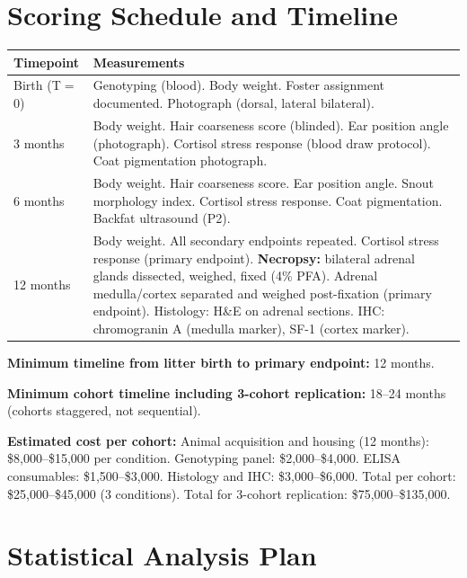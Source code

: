 \documentclass[10pt, a4paper]{article}
\begin{document}
\section{Scoring Schedule and Timeline}
\label{sec:timeline}

\begin{center}
\small
\begin{tabular}{p{2.2cm}p{9.5cm}}
\toprule
\textbf{Timepoint} & \textbf{Measurements} \\
\midrule
Birth (T$=$0) &
Genotyping (blood). Body weight.
Foster assignment documented.
Photograph (dorsal, lateral bilateral). \\[0.3em]
3 months &
Body weight. Hair coarseness score (blinded).
Ear position angle (photograph).
Cortisol stress response (blood draw protocol).
Coat pigmentation photograph. \\[0.3em]
6 months &
Body weight. Hair coarseness score.
Ear position angle. Snout morphology index.
Cortisol stress response.
Coat pigmentation. Backfat ultrasound (P2). \\[0.3em]
12 months &
Body weight. All secondary endpoints repeated.
Cortisol stress response (primary endpoint).
\textbf{Necropsy:} bilateral adrenal glands
dissected, weighed, fixed (4\% PFA).
Adrenal medulla/cortex separated and weighed
post-fixation (primary endpoint).
Histology: H\&E on adrenal sections.
IHC: chromogranin A (medulla marker),
SF-1 (cortex marker). \\
\bottomrule
\end{tabular}
\end{center}

\vspace{0.5em}
\textbf{Minimum timeline from litter birth
to primary endpoint:} 12 months.

\textbf{Minimum cohort timeline including
3-cohort replication:} 18--24 months
(cohorts staggered, not sequential).

\textbf{Estimated cost per cohort:}
Animal acquisition and housing (12 months):
\$8,000--\$15,000 per condition.
Genotyping panel: \$2,000--\$4,000.
ELISA consumables: \$1,500--\$3,000.
Histology and IHC: \$3,000--\$6,000.
Total per cohort: \$25,000--\$45,000
(3 conditions).
Total for 3-cohort replication:
\$75,000--\$135,000.

\section{Statistical Analysis Plan}
\label{sec:stats}
\end{document}
